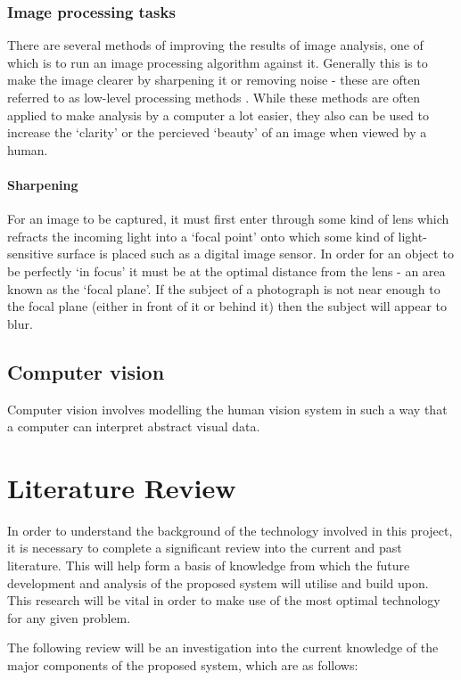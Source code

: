 \documentclass[a4paper,12pt]{report}
\begin{document}
   \subsection{Image processing tasks}
     There are several methods of improving the results of image analysis, one of which is to run an image processing algorithm against it. Generally this is to make the image clearer by sharpening it or removing noise - these are often referred to as low-level processing methods \citep{sonka2014image}. While these methods are often applied to make analysis by a computer a lot easier, they also can be used to increase the ‘clarity’ or the percieved ‘beauty’ of an image when viewed by a human.

     \subsubsection{Sharpening}
       For an image to be captured, it must first enter through some kind of lens which refracts the incoming light into a ‘focal point’ onto which some kind of light-sensitive surface is placed such as a digital image sensor. In order for an object to be perfectly ‘in focus’ it must be at the optimal distance from the lens - an area known as the ‘focal plane’. If the subject of a photograph is not near enough to the focal plane (either in front of it or behind it) then the subject will appear to blur.

  \section{Computer vision}
   Computer vision involves modelling the human vision system in such a way that a computer can interpret abstract visual data.

\chapter{Literature Review}

  In order to understand the background of the technology involved in this project, it is necessary to complete a significant review into the current and past literature. This will help form a basis of knowledge from which the future development and analysis of the proposed system will utilise and build upon. This research will be vital in order to make use of the most optimal technology for any given problem.

  The following review will be an investigation into the current knowledge of the major components of the proposed system, which are as follows:
\end{document}
